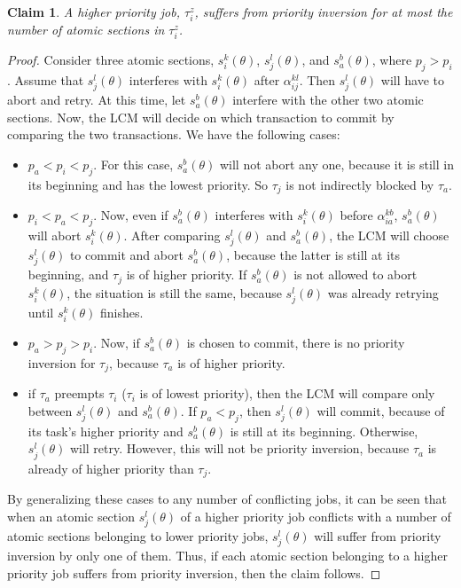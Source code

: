\documentclass[conference]{IEEEtran}
\newtheorem{clm}{Claim}
\begin{document}
\begin{clm}
\label{priority_inversion}
A higher priority job, $\tau_i^z$, suffers from priority inversion for at most the number of atomic sections in $\tau_i^z$.
\end{clm}
\begin{proof}
Consider three atomic sections, $s_i^k(\theta)$, $s_j^l(\theta)$, and $s_a^b(\theta)$, where $p_j > p_i$. Assume that $s_j^l(\theta)$ interferes with $s_i^k(\theta)$ after $\alpha_{ij}^{kl}$. Then $s_j^l(\theta)$ will have to abort and retry. At this time, let $s_a^b(\theta)$ interfere with the other two atomic sections. Now, the LCM will decide on which transaction to commit by comparing the two transactions. 
We have the following cases:
\begin{itemize}
\item $p_a < p_i < p_j$. For this case, $s_a^b(\theta)$ will not abort any one, because it is still in its beginning and has the lowest priority. So $\tau_j$ is not indirectly blocked by $\tau_a$.
%
\item $p_i<p_a<p_j$. Now, even if $s_a^b(\theta)$ interferes with $s_i^k(\theta)$ before $\alpha_{ia}^{kb}$, $s_a^b(\theta)$ will abort $s_i^k(\theta)$. After comparing $s_j^l(\theta)$ and $s_a^b(\theta)$, the LCM will choose $s_j^l(\theta)$ to commit and abort $s_a^b(\theta)$, because the latter is still at its beginning, and $\tau_j$ is of higher priority. If $s_a^b(\theta)$ is not allowed to abort $s_i^k(\theta)$, the situation is still the same, because $s_j^l(\theta)$ was already retrying until $s_i^k(\theta)$ finishes.
%
\item $p_a>p_j>p_i$. Now, if $s_a^b(\theta)$ is chosen to commit, there is no priority inversion for $\tau_j$,  because $\tau_a$ is of higher priority.
\item if $\tau_a$ preempts $\tau_i$ ($\tau_i$ is of lowest priority), then the LCM will compare only between $s_j^l(\theta)$ and $s_a^b(\theta)$. If $p_a<p_j$, then $s_j^l(\theta)$ will commit, because of its task's higher priority and $s_a^b(\theta)$ is still at its beginning. Otherwise, $s_j^l(\theta)$ will retry. However, this will not be priority inversion, because $\tau_a$ is already of higher priority than $\tau_j$.
\end{itemize}
By generalizing these cases to any number of conflicting jobs, it can be seen that when an atomic section  $s_j^l(\theta)$ of a higher priority job conflicts with a number of atomic sections belonging to lower priority jobs, $s_j^l(\theta)$ will suffer from priority inversion by only one of them. Thus, if each atomic section belonging to a higher priority job suffers from priority inversion, then the claim follows.
\end{proof}
\end{document}
